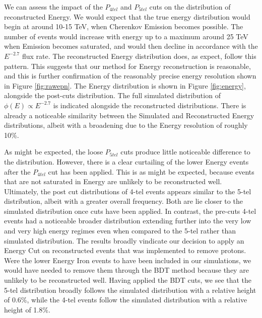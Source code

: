 \documentclass[11pt]{article}
\begin{document}
We can assess the impact of the $P_{4tel}$ and $P_{5tel}$ cuts on the distribution of reconstructed Energy. We would expect that the true energy distribution would begin at around 10-15 TeV, when Cherenkov Emission becomes possible. The number of events would increase with energy up to a maximum around 25 TeV when Emission becomes saturated, and would then decline in accordance with the $E^{-2.7}$ flux rate. The reconstructed Energy distribution does, as expect, follow this pattern. This suggests that our method for Energy reconstruction is reasonable, and this is further confirmation of the reasonably precise energy resolution shown in Figure \ref{fig:rawepn}. The Energy distribution is shown in Figure \ref{fig:energy}, alongside the post-cuts distribution. The full simulated distribution of $\phi(E) \propto E^{-2.7}$ is indicated alongside the reconstructed distributions. There is already a noticeable similarity between the Simulated and Reconstructed Energy distributions, albeit with a broadening due to the Energy resolution of roughly 10\%. 

As might be expected, the loose $P_{5tel}$ cuts produce little noticeable difference to the distribution. However, there is a clear curtailing of the lower Energy events after the $P_{4tel}$ cut has been applied. This is as might be expected, because events that are not saturated in Energy are unlikely to be reconstructed well. Ultimately, the post cut distributions of 4-tel events appears similar to the 5-tel distribution, albeit with a greater overall frequency. Both are lie closer to the simulated distribution once cuts have been applied. In contrast, the pre-cuts 4-tel events had a noticeable broader distribution extending further into the very low and very high energy regimes even when compared to the 5-tel rather than simulated distribution. The results broadly vindicate our decision to apply an Energy Cut on reconstructed events that was implemented to remove protons. Were the lower Energy Iron events to have been included in our simulations, we would have needed to remove them through the BDT method because they are unlikely to be reconstructed well. Having applied the BDT cuts, we see that the 5-tel distribution broadly follows the simulated distribution with a relative height of 0.6\%, while the 4-tel events follow the simulated distribution with a relative height of 1.8\%. 
\end{document}
